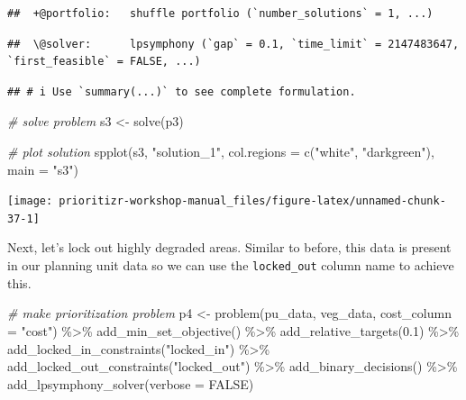 \documentclass[
  12pt,
]{book}
\newenvironment{Shaded}{\begin{snugshade}}{\end{snugshade}}
\newcommand{\AttributeTok}[1]{\textcolor[rgb]{0.77,0.63,0.00}{#1}}
\newcommand{\CommentTok}[1]{\textcolor[rgb]{0.56,0.35,0.01}{\textit{#1}}}
\newcommand{\ConstantTok}[1]{\textcolor[rgb]{0.00,0.00,0.00}{#1}}
\newcommand{\FloatTok}[1]{\textcolor[rgb]{0.00,0.00,0.81}{#1}}
\newcommand{\FunctionTok}[1]{\textcolor[rgb]{0.00,0.00,0.00}{#1}}
\newcommand{\NormalTok}[1]{#1}
\newcommand{\OtherTok}[1]{\textcolor[rgb]{0.56,0.35,0.01}{#1}}
\newcommand{\SpecialCharTok}[1]{\textcolor[rgb]{0.00,0.00,0.00}{#1}}
\newcommand{\StringTok}[1]{\textcolor[rgb]{0.31,0.60,0.02}{#1}}
\begin{document}
\begin{verbatim}
##  +@portfolio:   shuffle portfolio (`number_solutions` = 1, ...)
\end{verbatim}

\begin{verbatim}
##  \@solver:      lpsymphony (`gap` = 0.1, `time_limit` = 2147483647, `first_feasible` = FALSE, ...)
\end{verbatim}

\begin{verbatim}
## # i Use `summary(...)` to see complete formulation.
\end{verbatim}

\begin{Shaded}
\begin{Highlighting}[]
\CommentTok{\# solve problem}
\NormalTok{s3 }\OtherTok{\textless{}{-}} \FunctionTok{solve}\NormalTok{(p3)}

\CommentTok{\# plot solution}
\FunctionTok{spplot}\NormalTok{(s3, }\StringTok{"solution\_1"}\NormalTok{, }\AttributeTok{col.regions =} \FunctionTok{c}\NormalTok{(}\StringTok{"white"}\NormalTok{, }\StringTok{"darkgreen"}\NormalTok{), }\AttributeTok{main =} \StringTok{"s3"}\NormalTok{)}
\end{Highlighting}
\end{Shaded}

\begin{center}\texttt{[image: prioritizr-workshop-manual\_files/figure-latex/unnamed-chunk-37-1]} \end{center}

Next, let's lock out highly degraded areas. Similar to before, this data is present in our planning unit data so we can use the \texttt{locked\_out} column name to achieve this.

\begin{Shaded}
\begin{Highlighting}[]
\CommentTok{\# make prioritization problem}
\NormalTok{p4 }\OtherTok{\textless{}{-}} \FunctionTok{problem}\NormalTok{(pu\_data, veg\_data, }\AttributeTok{cost\_column =} \StringTok{"cost"}\NormalTok{) }\SpecialCharTok{\%\textgreater{}\%}
      \FunctionTok{add\_min\_set\_objective}\NormalTok{() }\SpecialCharTok{\%\textgreater{}\%}
      \FunctionTok{add\_relative\_targets}\NormalTok{(}\FloatTok{0.1}\NormalTok{) }\SpecialCharTok{\%\textgreater{}\%}
      \FunctionTok{add\_locked\_in\_constraints}\NormalTok{(}\StringTok{"locked\_in"}\NormalTok{) }\SpecialCharTok{\%\textgreater{}\%}
      \FunctionTok{add\_locked\_out\_constraints}\NormalTok{(}\StringTok{"locked\_out"}\NormalTok{) }\SpecialCharTok{\%\textgreater{}\%}
      \FunctionTok{add\_binary\_decisions}\NormalTok{() }\SpecialCharTok{\%\textgreater{}\%}
      \FunctionTok{add\_lpsymphony\_solver}\NormalTok{(}\AttributeTok{verbose =} \ConstantTok{FALSE}\NormalTok{)}
\end{Highlighting}
\end{Shaded}
\end{document}
